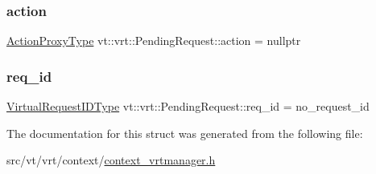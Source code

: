 \subsubsection{\texorpdfstring{action}{action}}
{\footnotesize\ttfamily \hyperlink{namespacevt_a102aa105d64254d89f7e585d106c95aa}{Action\+Proxy\+Type} vt\+::vrt\+::\+Pending\+Request\+::action = nullptr}

\mbox{\label{structvt_1_1vrt_1_1_pending_request_a6b50fb651ed1f7f7a38220543b79f968}} 
\subsubsection{\texorpdfstring{req\+\_\+id}{req\_id}}
{\footnotesize\ttfamily \hyperlink{namespacevt_1_1vrt_ac7ef8820ebfc383fa16f09bf46eaa2b8}{Virtual\+Request\+I\+D\+Type} vt\+::vrt\+::\+Pending\+Request\+::req\+\_\+id = no\+\_\+request\+\_\+id}



The documentation for this struct was generated from the following file\+:\begin{DoxyCompactItemize}
\item 
src/vt/vrt/context/\hyperlink{context__vrtmanager_8h}{context\+\_\+vrtmanager.\+h}\end{DoxyCompactItemize}
